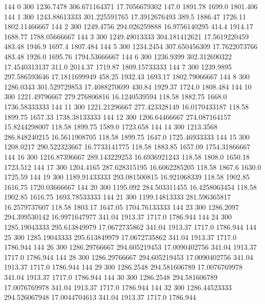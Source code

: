 144  0  300  1236.7478  306.671164371  17.7056679302  147.0  1891.78  1699.0  1801.406 
144  1  300  1243.88613333  301.225591765  17.3912676493  389.5  1886.47  1726.11  1802.11466667 
144  2  300  1249.4756  294.026259888  16.9756140295  414.4  1914.17  1688.77  1788.05666667 
144  3  300  1249.49013333  304.181412621  17.5619220459  483.48  1946.9  1697.4  1807.484 
144  5  300  1234.2454  307.650456309  17.7622073766  483.48  1926.0  1695.76  1794.53666667 
144  6  300  1236.9399  302.312690322  17.4540313137  311.0  2014.37  1719.87  1809.15733333 
144  7  300  1239.9895  297.586593646  17.1811699949  458.25  1932.43  1693.17  1802.79066667 
144  8  300  1286.0343  301.529729853  17.4088270699  430.84  1929.37  1724.0  1808.484 
144  10  300  1221.49796667  279.276806816  16.1240539594  118.58  1882.75  1668.0  1736.58333333 
144  11  300  1221.21296667  277.423328149  16.0170433187  118.58  1899.75  1657.33  1738.38133333 
144  12  300  1206.64466667  274.087164157  15.8244298007  118.58  1899.75  1589.0  1723.658 
144  14  300  1213.3568  286.848240215  16.5611908705  118.58  1899.75  1647.0  1725.46933333 
144  15  300  1208.0217  290.522323667  16.7733141775  118.58  1883.85  1657.09  1754.31866667 
144  16  300  1216.87396667  289.143229253  16.6936921243  118.58  1808.0  1650.18  1723.512 
144  17  300  1204.4165  287.628315195  16.6062285205  118.58  1867.6  1630.0  1725.59 
144  19  300  1189.91433333  293.081500815  16.921068339  118.58  1902.85  1616.75  1720.03666667 
144  20  300  1195.092  284.503311455  16.4258063454  118.58  1902.85  1616.75  1693.78533333 
144  21  300  1199.14813333  281.596365817  16.2579737607  118.58  1803.17  1647.05  1704.76133333 
144  23  300  1286.2097  294.399530142  16.9971647977  341.04  1913.37  1717.0  1786.944 
144  24  300  1285.19043333  295.613849979  17.0672735862  341.04  1913.37  1717.0  1786.944 
144  25  300  1285.19043333  295.613849979  17.0672735862  341.04  1913.37  1717.0  1786.944 
144  26  300  1286.29766667  294.605219453  17.0090402756  341.04  1913.37  1717.0  1786.944 
144  28  300  1286.29766667  294.605219453  17.0090402756  341.04  1913.37  1717.0  1786.944 
144  29  300  1286.2548  294.581606789  17.0076769978  341.04  1913.37  1717.0  1786.944 
144  30  300  1286.2548  294.581606789  17.0076769978  341.04  1913.37  1717.0  1786.944 
144  32  300  1286.44523333  294.526067948  17.0044704613  341.04  1913.37  1717.0  1786.944 

